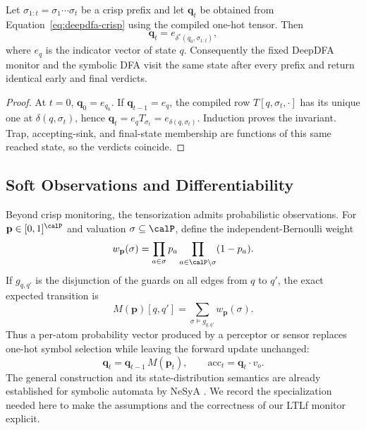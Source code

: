 \begin{proposition}
\label{prop:deepdfa-crisp-equivalence}
Let $\sigma_{1:t}=\sigma_1\cdots\sigma_t$ be a crisp prefix and let $\mathbf q_t$ be obtained from Equation~\eqref{eq:deepdfa-crisp} using the compiled one-hot tensor. Then
\[
  \mathbf q_t=e_{\delta^*(q_0,\sigma_{1:t})},
\]
where $e_q$ is the indicator vector of state $q$. Consequently the fixed DeepDFA monitor and the symbolic DFA visit the same state after every prefix and return identical early and final verdicts.
\end{proposition}

\begin{proof}
At $t=0$, $\mathbf q_0=e_{q_0}$. If $\mathbf q_{t-1}=e_q$, the compiled row $T[q,\sigma_t,\cdot]$ has its unique one at $\delta(q,\sigma_t)$, hence $\mathbf q_t=e_qT_{\sigma_t}=e_{\delta(q,\sigma_t)}$. Induction proves the invariant. Trap, accepting-sink, and final-state membership are functions of this same reached state, so the verdicts coincide.
\end{proof}

\subsection{Soft Observations and Differentiability}
\label{sec:deepdfa-soft}

Beyond crisp monitoring, the tensorization admits probabilistic observations. For $\mathbf p\in[0,1]^{\calP}$ and valuation $\sigma\subseteq\calP$, define the independent-Bernoulli weight
\begin{equation}
  w_{\mathbf p}(\sigma)
  =\prod_{a\in\sigma}p_a\prod_{a\in\calP\setminus\sigma}(1-p_a).
  \label{eq:valuation-weight}
\end{equation}
If $g_{q,q'}$ is the disjunction of the guards on all edges from $q$ to $q'$, the exact expected transition is
\begin{equation}
  M(\mathbf p)[q,q']
  =\sum_{\sigma\models g_{q,q'}}w_{\mathbf p}(\sigma).
  \label{eq:expected-transition-wmc}
\end{equation}
Thus a per-atom probability vector produced by a perceptor or sensor replaces one-hot symbol selection while leaving the forward update unchanged:
\begin{equation}
  \mathbf{q}_t = \mathbf{q}_{t-1}\, M(\mathbf{p}_t),
  \qquad
  \mathrm{acc}_t = \mathbf{q}_t \cdot v_o.
  \label{eq:deepdfa-soft}
\end{equation}
The general construction and its state-distribution semantics are already established for symbolic automata by NeSyA \cite{NesyA}. We record the specialization needed here to make the assumptions and the correctness of our LTLf monitor explicit.

